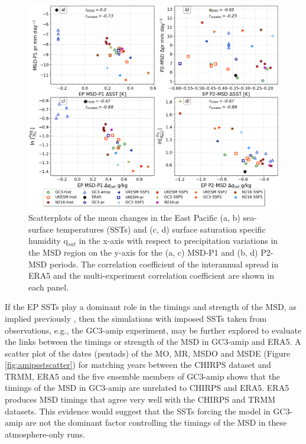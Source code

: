 \begin{figure}[t!]
\includegraphics[width=\linewidth]{figures/sst_scatter_f.png}
\caption[Scatter plot of SST changes]{Scatterplots of the mean changes in the East Pacific (a, b) sea-surface temperatures (SSTs) and (c, d) surface saturation specific humidity q$_{sat}$ in the x-axis with respect to precipitation variations in the MSD region on the y-axis for the (a, c) MSD-P1 and (b, d) P2-MSD periods.  The correlation coefficient of the interannual spread in ERA5 and the multi-experiment correlation coefficient are shown in each panel.   }
\label{fig:var_sst_lhf_scatter}
\end{figure}


If the EP SSTs play a dominant role in the timings and strength of the MSD, as implied previously \citep{magana1999,magana2005,herrera2015}, then the simulations with imposed SSTs taken from observations, e.g., the GC3-amip experiment, may be further explored to evaluate the links  between the timings or strength of the MSD in GC3-amip and ERA5. A scatter plot of the dates (pentads) of the MO, MR, MSDO and MSDE (Figure \ref{fig:amipsstscatter}) for matching years between the CHIRPS dataset and TRMM, ERA5 and the five ensemble members of GC3-amip shows that the timings of the MSD in GC3-amip are unrelated to CHIRPS and ERA5. ERA5 produces MSD timings that agree very well with the CHIRPS and TRMM datasets. 
This evidence would suggest that the SSTs forcing the model in GC3-amip are not the dominant factor controlling the timings of the MSD in these atmosphere-only runs.

